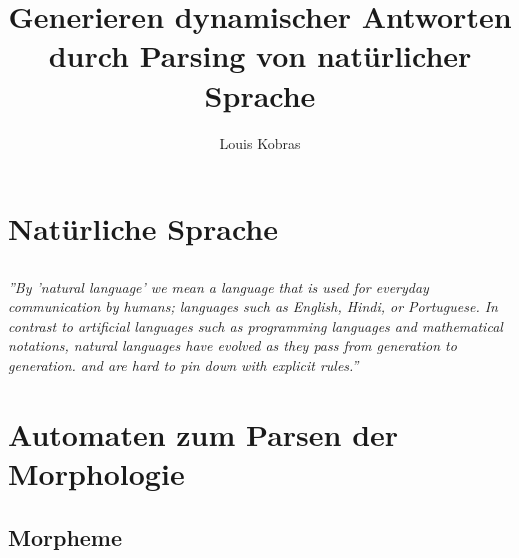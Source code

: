 \documentclass[pdf]{beamer}
\title{Generieren dynamischer Antworten durch Parsing von natürlicher Sprache}
\author{Louis Kobras}
\begin{document}
	\begin{frame}
		\titlepage
	\end{frame}
	\begin{frame}
		\tableofcontents
	\end{frame}

	\section{Natürliche Sprache}
		\subsection{}
			\begin{frame}
				\textit{''By 'natural language' we mean a language that is used for everyday communication by humans; languages such as English, Hindi, or Portuguese.
        In contrast to artificial languages such as programming languages and mathematical notations, natural languages have evolved as they pass from generation to generation.
        and are hard to pin down with explicit rules.''}
			\end{frame}
			\begin{frame}
			
			\end{frame}
	\section{Automaten zum Parsen der Morphologie}
		\subsection{Morpheme}
			\begin{frame}
			
			\end{frame}
			\begin{frame}
			
			\end{frame}
\end{document}
